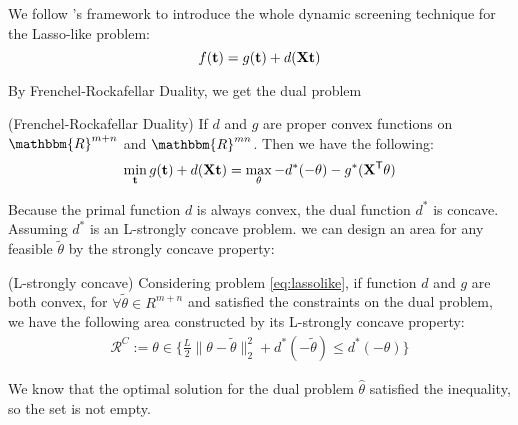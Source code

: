 We follow \citep{NEURIPS2021_7b5b23f4}'s framework to introduce the whole dynamic screening technique for the Lasso-like problem:
\begin{equation}
\label{eq:lassolike}
f(\mathbf{t}) = g(\mathbf{t}) + d(\mathbf{X} \mathbf{t})
\end{equation}

By Frenchel-Rockafellar Duality, we get the dual problem
\begin{thm}
 (Frenchel-Rockafellar Duality) If $d$ and $g$ are proper convex functions on $\mathbbm{R}^{m+n}$ and $\mathbbm{R}^{mn}$. Then we have the following:
 $$
\begin{aligned}
\min_{\mathbf{t}} g(\mathbf{t}) + d(\mathbf{X}\mathbf{t}) = \max_{\theta} -d^*(-\theta)-g^*(\mathbf{X}^{\mathsf T}\theta)
\end{aligned}
$$
\end{thm}

Because the primal function $d$ is always convex, the dual function $d^*$ is concave. Assuming $d^*$ is an L-strongly concave problem. we can design an area for any feasible $\tilde{\theta}$ by the strongly concave property:

\begin{thm}\label{circle}
(L-strongly concave) Considering problem \ref{eq:lassolike}, if function $d$ and $g$ are both convex, for $\forall \tilde{\theta} \in{R^{m+n}}$ and satisfied the constraints on the dual problem, we have the following area constructed by its L-strongly concave property:  
$$
\begin{aligned}
\mathcal{R}^{C}:=\theta \in \{\frac{L}{2}\|\theta-\tilde{\theta}\|_2^2+d^*(-\tilde{\theta}) \leq d^*(-\theta)\}
\end{aligned}
$$
\end{thm}
We know that the optimal solution for the dual problem $\hat{\theta}$ satisfied the inequality, so the set is not empty.





